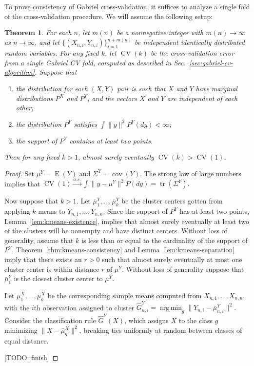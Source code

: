 \documentclass[11pt]{article}
\newtheorem{theorem}{Theorem}
\DeclareMathOperator*{\argmin}{arg\,min}
\newcommand{\CV}{\operatorname{CV}}
\newcommand{\E}{\operatorname{E}}
\DeclareMathOperator*{\cov}{cov}
\DeclareMathOperator*{\tr}{tr}
\newcommand{\toas}{\overset{\mathit{a.s.}}{\to}}
\newcommand{\muY}{\mu^{Y}}
\newcommand{\bmuX}{\bar \mu^{X}}
\newcommand{\bmuY}{\bar \mu^{Y}}
\newcommand{\SigmaY}{\Sigma^Y}
\newcommand{\hGY}{\hat G^{Y}}
\begin{document}
To prove consistency of Gabriel cross-validation, it suffices to analyze a
single fold of the cross-validation procedure.  We will assume the following
setup:


\begin{theorem}
For each $n$, let $m(n)$ be a nonnegative integer with $m(n) \to \infty$ as $n
\to \infty$, and let $\{ (X_{n,i}, Y_{n,i}) \}_{i=1}^{n+m(n)}$ be independent
identically distributed random variables.  For any fixed $k$, let $\CV(k)$
be the cross-validation error from a single Gabriel CV fold, computed as
described in Sec.~\ref{sec:gabriel-cv-algorithm}.  Suppose that
\begin{enumerate}[label=(\roman*)]
\item the distribution for each $(X, Y)$ pair is such that $X$ and $Y$ have
  marginal distributions $P^X$ and $P^Y$, and the vectors $X$ and $Y$ are
  independent of each other;

\item the distribution $P^Y$ satisfies $\int \|y\|^2 P^Y(dy) < \infty$;

\item the support of $P^Y$ contains at least two points.
\end{enumerate}
Then for any fixed $k > 1$, almost surely eventually  $\CV(k) > \CV(1)$.
\end{theorem}
\begin{proof}
Set $\muY = \E(Y)$ and $\SigmaY = \cov(Y)$.  The strong law of large
numbers implies that
\(
  \CV(1) \toas \int \|y - \mu^Y\|^2 P(dy) = \tr(\SigmaY).
\)

Now suppose that $k > 1$.  Let $\bmuY_1, \dotsc, \bmuY_k$ be the cluster
centers gotten from applying $k$-means to $Y_{n,1}, \dotsc, Y_{n,n}$.  Since
the support of $P^Y$ has at least two points,
Lemma~\ref{lem:kmeans-existence}, implies that almost surely eventually at
least two of the clusters will be nonempty and have distinct centers.  Without
loss of generality, assume that $k$ is less than or equal to the cardinality
of the support of $P^Y$.  Theorem~\ref{thm:kmeans-consistency} and
Lemma~\ref{lem:kmeans-separation} imply that there exists an $r > 0$ such that
almost surely eventually at most one cluster center is within distance $r$ of
$\muY$.  Without loss of generality suppose that $\bmuY_1$ is the closest
cluster center to $\muY$.


Let $\bmuX_1, \dotsc, \bmuX_k$ be the corresponding sample means computed from
$X_{n,1}, \dotsc, X_{n,n}$, with the $i$th observation assigned to cluster
$\hGY_{n,i} = \argmin_g \| Y_{n,i} - \bmuY_{n,i} \|^2.$  Consider the
classification rule $\hGY(X)$, which assigns $X$ to the class $g$ minimizing
$\|X - \bmuX_g\|^2$, breaking ties uniformly at random between classes of
equal distance.

[TODO: finish]


\end{proof}
\end{document}
